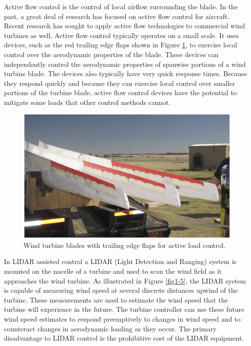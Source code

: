 Active flow control is the control of local airflow surrounding the blade.  In the past, a great deal of research has focused on active flow control for aircraft. Recent research has sought to apply active flow technologies to commercial wind turbines as well. Active flow control typically operates on a small scale.  It uses devices, such as the red trailing edge flaps shown in Figure \ref{fig1-4}, to exercise local control over the aerodynamic properties of the blade.  These devices can independently control the aerodynamic properties of spanwise portions of a wind turbine blade.  The devices also typically have very quick response times.  Because they respond quickly and because they can exercise local control over smaller portions of the turbine blade, active flow control devices have the potential to mitigate some loads that other control methods cannot.  



\begin{figure}[ht]
	\centering
		\includegraphics[width=.75\linewidth]{Figures/ch1Figures/fig1-4.png}
	\caption{Wind turbine blades with trailing edge flaps for active load control.\cite{berg2012}}
	\label{fig1-4}
\end{figure}

In LIDAR assisted control a LIDAR (Light Detection and Ranging) system is mounted on the nacelle of a turbine and used to scan the wind field as it approaches the wind turbine.  As illustrated in Figure \ref{fig1-5}, the LIDAR system is capable of measuring wind speed at several discrete distances upwind of the turbine.  These measurements are used to estimate the wind speed that the turbine will experience in the future.  The turbine controller can use these future wind speed estimates to respond preemptively to changes in wind speed and to counteract changes in aerodynamic loading as they occur. The primary disadvantage to LIDAR control is the prohibitive cost of the LIDAR equipment.  

